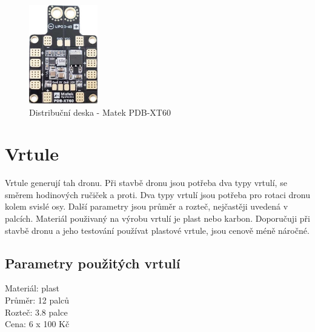 \begin{figure}[h]
	\centering
	\includegraphics[width=3cm]{pictures/pdb.jpg}
	\caption{Distribuční deska - Matek PDB-XT60}
\end{figure}

\section{Vrtule} 
Vrtule generují tah dronu. Při stavbě dronu jsou potřeba dva typy vrtulí, se směrem hodinových ručiček a proti. Dva typy vrtulí jsou potřeba pro rotaci dronu kolem svislé osy. Další parametry jsou průměr a rozteč, nejčastěji uvedená v palcích. Materiál použivaný na výrobu vrtulí je plast nebo karbon. Doporučuji při stavbě dronu a jeho testování používat plastové vrtule, jsou cenově méně náročné.

\subsection{Parametry použitých vrtulí} 
Materiál: plast\\
Průměr: 12 palců\\
Rozteč: 3.8 palce\\
Cena: 6 x 100 Kč\\

